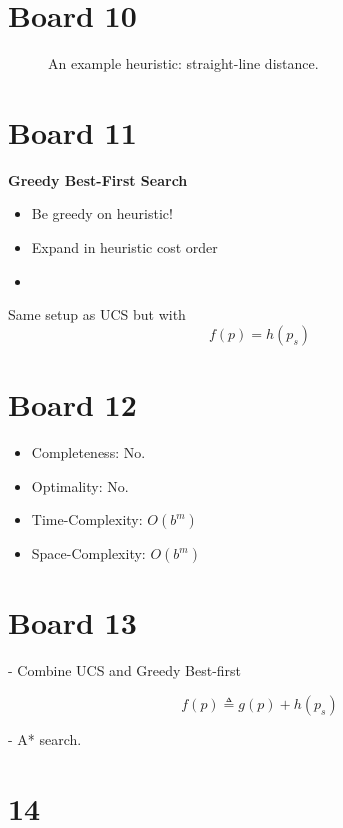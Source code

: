 \documentclass[10pt]{article}
\def\Graph{\path node(A)[draw, initial, state] at (-2, 1) {A};
    \path node(B)[draw, state] at (-1, 3) {B};
    \path node(C)[draw, state, accepting] at (4, 2) {C};
    \path node(D)[draw, state] at (1, 1) {D};
    \path node(E)[draw, state] at (2, 3) {E};
    \path[draw] (A) --node[xshift=-0.2cm]{2} (B); 
    \path[draw] (B) --node[yshift=0.2cm]{4} (E); 
    \path[draw] (A) --node[yshift=0.2cm]{3} (D); 
    \path[draw] (A) --node[yshift=0.2cm]{5} (E); 
    \path[draw] (D) --node[yshift=0.2cm]{4} (C); 
    \path[draw] (E) --node[yshift=0.2cm]{4} (C); 
}
\begin{document}
\section{Board 10}


\begin{figure}
  \centering


 
  \caption{\label{fig:heu} An example heuristic: straight-line distance.}
\end{figure}

\section{Board 11}

\textbf{Greedy Best-First Search}

\begin{itemize}
\item Be greedy on heuristic! 
\item Expand in heuristic cost order
\item 
\end{itemize}

Same setup as UCS but with 
 \[f(p) = h(p_s) \]  


\section{Board 12} 

\begin{itemize}
\item Completeness: No.  
\item Optimality: No. 
\item Time-Complexity: $O(b^m)$
\item Space-Complexity: $O(b^m)$ 
\end{itemize}

\section{Board 13}

- Combine UCS and Greedy Best-first

\[f(p) \triangleq g(p) + h(p_s) \]  

- A* search. 


\section{14}
\end{document}
